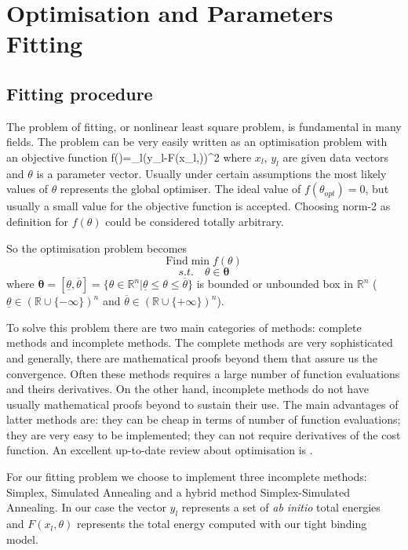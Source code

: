 \chapter[Fitting]%
{Optimisation and Parameters Fitting}
\label{ch:three}
%
\section{Fitting procedure}
\par{The problem of fitting, or nonlinear least square problem, is fundamental in
many fields. The problem can be very easily written as an optimisation problem
with an objective function}
\be
f(\theta)=\sum_{l}(y_l-F(x_l,\theta))^2
\ee
where $x_l$, $y_l$ are given data vectors and $\theta$ is a parameter
vector. Usually under certain assumptions the most likely values of $\theta$
represents the global optimiser. The ideal value of $f(\theta_{opt})=0$, but
usually a small value for the objective function is accepted. Choosing norm-2
as definition for $f(\theta)$ could be considered totally arbitrary.
\par{So the optimisation problem becomes}
\begin{equation*}
\textrm{Find} \min f(\theta)
\end{equation*}
\begin{equation*}
s.t.\quad\theta\in\boldsymbol{\theta}
\end{equation*}
where
$\boldsymbol{\theta}=[\underline{\theta},\overline{\theta}]=\{\theta\in\mathbb{R}^n|\underline{\theta}\leq\theta\leq\overline{\theta}\}$
is bounded or unbounded box in $\mathbb{R}^n$
($\underline{\theta}\in(\mathbb{R}\cup\{-\infty\})^n$ and
$\overline{\theta}\in(\mathbb{R}\cup\{+\infty\})^n$).
\par{To solve this problem there are two main categories of methods: complete
methods and incomplete methods. The complete methods are very sophisticated and
generally, there are mathematical proofs beyond them that assure us the
convergence. Often these methods requires a large number of function
evaluations and theirs derivatives. On the other hand, incomplete methods do
not have usually mathematical proofs beyond to sustain their use. The main
advantages of latter methods are: they can be cheap in terms of number of
function evaluations; they are very easy to be implemented; they can not
require derivatives of the cost function. An excellent up-to-date review about
optimisation is \citep{Neumaier03}.}
\par{For our fitting problem we choose to implement three incomplete methods:
Simplex, Simulated Annealing and a hybrid method Simplex-Simulated
Annealing. In our case the vector $y_l$ represents a set of \emph{ab initio}
total energies and $F(x_l,\theta)$ represents the total energy computed with
our tight binding model.}
